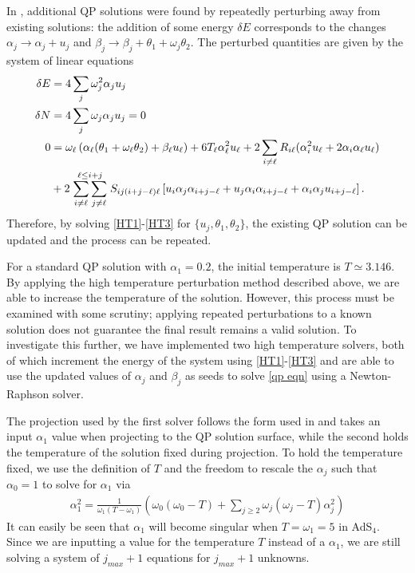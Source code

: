 \documentclass[../PhD.tex]{subfiles}
\begin{document}
In \cite{1507.08261}, additional QP solutions were found by repeatedly perturbing away from existing solutions: the addition of some energy $\delta E$ corresponds to the changes $\alpha_j \to \alpha_j + u_j$ and $\beta_j \to \beta_j + \theta_1 + \omega_j \theta_2$. The perturbed quantities are given by the system of linear equations
\begin{align}
\label{HT1}
\delta E &= 4 \sum_j \omega^2_j \alpha_j u_j \\
\label{HT2}
\delta N &= 4 \sum_j \omega_j \alpha_j u_j = 0 \\
\label{HT3}
0 &= \omega_\ell \left( \alpha_\ell (\theta_1 + \omega_\ell \theta_2) +\beta_\ell u_\ell \right) + 6T_\ell \alpha_\ell^2 u_\ell + 2 \sum_{i \neq \ell} R_{i\ell} (\alpha_i^2 u_\ell + 2 \alpha_i \alpha_\ell u_\ell ) \nonumber \\
& + 2 \stackrel{\ell \leq i + j}{\sum_{i \neq \ell} \sum_{j \neq \ell}} S_{ij(i+j-\ell)\ell} \left[ u_i \alpha_j \alpha_{i+j-\ell} + u_j \alpha_i \alpha_{i+j-\ell} + \alpha_i \alpha_j u_{i+j-\ell} \right].
\end{align}
Therefore, by solving \eqref{HT1}-\eqref{HT3} for $\{ u_j, \theta_1, \theta_2 \}$, the existing QP solution can be updated and the process can be repeated. 

For a standard QP solution with $\alpha_1 = 0.2$, the initial temperature is $T \simeq 3.146$. By applying the high temperature perturbation method described above, we are able to increase the temperature of the solution. However, this process must be examined with some scrutiny; applying repeated perturbations to a known solution does not guarantee the final result remains a valid solution. To investigate this further, we have implemented two high temperature solvers, both of which increment the energy of the system using \eqref{HT1}-\eqref{HT3} and are able to use the updated values of $\alpha_j$ and $\beta_j$ as seeds to solve \eqref{qp eqn} using a Newton-Raphson solver.

The projection used by the first solver follows the form used in \cite{1507.08261} and takes an input $\alpha_1$ value when projecting to the QP solution surface, while the second holds the temperature of the solution fixed during projection. To hold the temperature fixed, we use the definition of $T$ and the freedom to rescale the $\alpha_j$ such that $\alpha_0 = 1$ to solve for $\alpha_1$ via
\begin{align}
\label{a1 eqn}
\alpha_1^2 = \frac{1}{\omega_1 (T - \omega_1)} \left( \omega_0 (\omega_0 - T) + \sum_{j \geq 2} \omega_j (\omega_j - T) \alpha_j^2 \right)
\end{align}
It can easily be seen that $\alpha_1$ will become singular when $T = \omega_1 = 5$ in AdS$_4$. Since we are inputting a value for the temperature $T$ instead of a $\alpha_1$, we are still solving a system of $j_{max} + 1$ equations for $j_{max} + 1$ unknowns.
\end{document}
